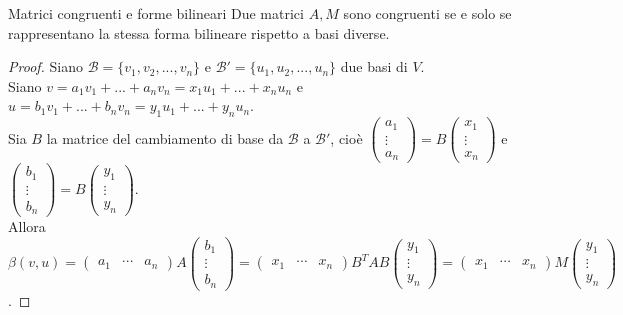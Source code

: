 \documentclass[a4paper]{article}
\theoremstyle{definition}
\begin{document}
	\begin{teo}{Matrici congruenti e forme bilineari}{}
		Due matrici $A, M$ sono congruenti se e solo se rappresentano la stessa forma bilineare rispetto a basi diverse.
	\end{teo}
	\begin{proof}
		Siano $\mathcal{B} = \{v_1, v_2, ..., v_n\}$ e $\mathcal{B}' = \{u_1, u_2, ..., u_n\}$ due basi di $V$. \\
		Siano $v = a_1v_1 + ... + a_nv_n = x_1u_1 + ... + x_nu_n$ e $u = b_1v_1 + ... + b_nv_n = y_1u_1 + ... + y_nu_n$. \\
		Sia $B$ la matrice del cambiamento di base da $\mathcal{B}$ a $\mathcal{B}'$, cioè $\begin{pmatrix}
			a_1 \\
			\vdots \\
			a_n
		\end{pmatrix} = B \begin{pmatrix}
			x_1 \\
			\vdots \\
			x_n
		\end{pmatrix}$ e $\begin{pmatrix}
			b_1 \\
			\vdots \\
			b_n
		\end{pmatrix} = B \begin{pmatrix}
			y_1 \\
			\vdots \\
			y_n
		\end{pmatrix}$. \\
		Allora $\beta(v, u) = \begin{pmatrix}
			a_1 & \cdots & a_n
		\end{pmatrix}A \begin{pmatrix}
			b_1 \\
			\vdots \\
			b_n
		\end{pmatrix} = \begin{pmatrix}
			x_1 & \cdots & x_n
		\end{pmatrix}B^T A B \begin{pmatrix}
			y_1 \\
			\vdots \\
			y_n
		\end{pmatrix} = \begin{pmatrix}
			x_1 & \cdots & x_n
		\end{pmatrix} M \begin{pmatrix}
			y_1 \\
			\vdots \\
			y_n
		\end{pmatrix}$.
	\end{proof}
\end{document}
